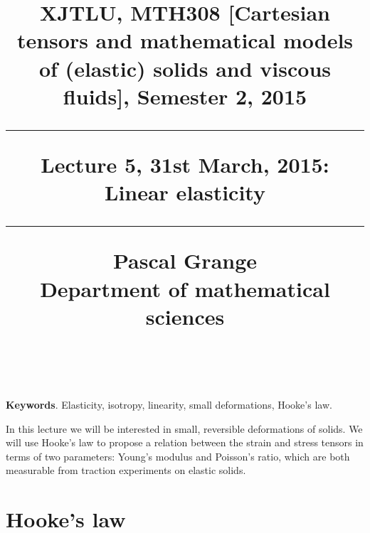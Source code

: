 \documentclass[DIV=12]{article}
\begin{document}
\title{
\noindent\hrulefill
\begin{flushleft}
{\Large \bf{XJTLU, MTH308 [Cartesian tensors and mathematical models of (elastic) solids and viscous fluids], Semester 2, 2015\\
\vspace{8mm}
\hrule
\vspace{6mm}
 Lecture 5, 31st March, 2015: Linear elasticity}}
\vspace{8mm} 
\hrule
\vspace{6mm}
{\Large{Pascal Grange\\
Department of mathematical sciences\\
{}\\
}}
\noindent\hrulefill
\end{flushleft}}
\date{}
\author{}
\maketitle
\vspace{-9mm}
 
{\bf{Keywords}}. Elasticity, isotropy, linearity, small deformations, Hooke's law.\\
\vspace{3mm}

\tableofcontents

\vspace{4mm}




In this lecture we will be interested in small, reversible deformations
 of solids.  We will use Hooke's law  to propose a relation between the strain and stress
tensors in terms of two parameters: Young's modulus and Poisson's ratio, which are both
measurable from traction experiments on elastic solids.


\section{Hooke's law}
\end{document}
